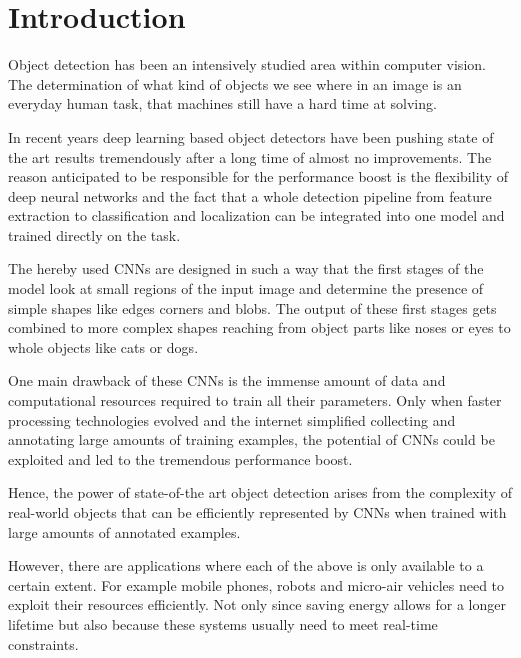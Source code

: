 \chapter{Introduction}
\label{sec:intro}

Object detection has been an intensively studied area within computer vision. The determination of what kind of objects we see where in an image is an everyday human task, that machines still have a hard time at solving.


In recent years deep learning based object detectors have been pushing state of the art results tremendously after a long time of almost no improvements. The reason anticipated to be responsible for the performance boost is the flexibility of deep neural networks and the fact that a whole detection pipeline from feature extraction to classification and localization can be integrated into one model and trained directly on the task.

The hereby used \acp{CNN} are designed in such a way that the first stages of the model look at small regions of the input image and determine the presence of simple shapes like edges corners and blobs. The output of these first stages gets combined to more complex shapes reaching from object parts like noses or eyes to whole objects like cats or dogs.

One main drawback of these \acp{CNN} is the immense amount of data and computational resources required to train all their parameters. Only when faster processing technologies evolved and the internet simplified collecting and annotating large amounts of training examples, the potential of \acp{CNN} could be exploited  and led to the tremendous performance boost. 

Hence, the power of state-of-the art object detection arises from the complexity of real-world objects that can be efficiently represented by \acp{CNN} when trained with large amounts of annotated examples.

However, there are applications where each of the above is only available to a certain extent. For example mobile phones, robots and micro-air vehicles need to exploit their resources efficiently. Not only since saving energy allows for a longer lifetime but also because these systems usually need to meet real-time constraints.

